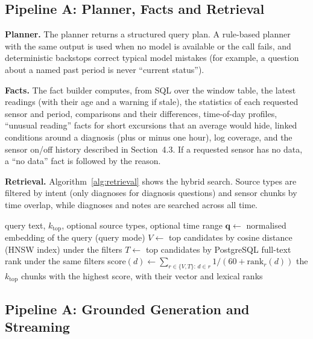 \subsection{Pipeline A: Planner, Facts and Retrieval}

\noindent\textbf{Planner.} The planner returns a structured query plan. A rule-based planner with the same output is used when no model
is available or the call fails, and deterministic backstops correct typical model mistakes (for example, a question about a named past period is
never ``current status'').

\noindent\textbf{Facts.} The fact builder computes, from SQL over the window table, the latest readings (with their age and a warning if
stale), the statistics of each requested sensor and period, comparisons and their differences, time-of-day profiles, ``unusual
reading'' facts for short excursions that an average would hide, linked conditions around a diagnosis (plus or minus one hour), log
coverage, and the sensor on/off history described in Section~4.3. If a requested sensor has no data, a ``no data'' fact is followed by
the reason.

\noindent\textbf{Retrieval.} Algorithm~\ref{alg:retrieval} shows the hybrid search. Source types are filtered by intent (only diagnoses
for diagnosis questions) and sensor chunks by time overlap, while diagnoses and notes are searched across all time.

\begin{algorithm}[H]
\caption{Hybrid retrieval with Reciprocal Rank Fusion}
\label{alg:retrieval}
\begin{algorithmic}[1]
\Require query text, $k_{\mathrm{top}}$, optional source types, optional time range
\State $\mathbf q\gets$ normalised embedding of the query (query mode)
\State $V\gets$ top candidates by cosine distance (HNSW index) under the filters
\State $T\gets$ top candidates by PostgreSQL full-text rank under the same filters
  \State score$(d)\gets \sum_{r\in\{V,T\}:\,d\in r} 1/(60+\mathrm{rank}_r(d))$
\EndFor
\State \Return the $k_{\mathrm{top}}$ chunks with the highest score, with their vector and lexical ranks
\end{algorithmic}
\end{algorithm}

\subsection{Pipeline A: Grounded Generation and Streaming}

